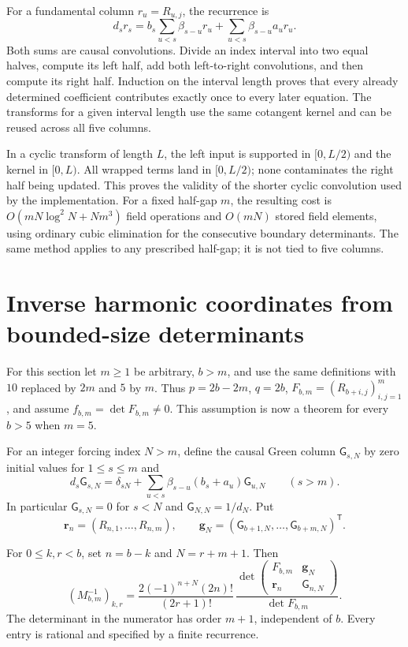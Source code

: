 For a fundamental column $r_u=R_{u,j}$, the recurrence is
\[
 d_sr_s=b_s\sum_{u<s}\beta_{s-u}r_u
                  +\sum_{u<s}\beta_{s-u}a_ur_u.
\]
Both sums are causal convolutions. Divide an index interval into
two equal halves, compute its left half, add both left-to-right
convolutions, and then compute its right half. Induction on the
interval length proves that every already determined coefficient
contributes exactly once to every later equation. The transforms
for a given interval length use the same cotangent kernel and can
be reused across all five columns.

In a cyclic transform of length $L$, the left input is supported
in $[0,L/2)$ and the kernel in $[0,L)$. All wrapped terms land in
$[0,L/2)$; none contaminates the right half being updated.
This proves the validity of the shorter cyclic convolution used
by the implementation. For a fixed half-gap $m$, the resulting
cost is $O(mN\log^2N+Nm^3)$ field operations and $O(mN)$ stored
field elements, using ordinary cubic elimination for the consecutive
boundary determinants. The same method applies to any prescribed
half-gap; it is not tied to five columns.

\section{Inverse harmonic coordinates from bounded-size determinants}
\label{gt:green-section}

For this section let $m\ge1$ be arbitrary, $b>m$, and use the same
definitions with $10$ replaced by $2m$ and $5$ by $m$.
Thus $p=2b-2m$, $q=2b$, $F_{b,m}=(R_{b+i,j})_{i,j=1}^m$, and
assume $f_{b,m}=\det F_{b,m}\ne0$. This assumption is now a theorem
for every $b>5$ when $m=5$.

For an integer forcing index $N>m$, define the causal Green column
$\mathsf G_{s,N}$ by zero initial values for $1\le s\le m$ and
\begin{equation}\label{gt:Green}
 d_s\mathsf G_{s,N}
 =\delta_{sN}+\sum_{u<s}\beta_{s-u}(b_s+a_u)\mathsf G_{u,N}
                                  \qquad(s>m).
\end{equation}
In particular $\mathsf G_{s,N}=0$ for $s<N$ and
$\mathsf G_{N,N}=1/d_N$. Put
\[
 \mathbf r_n=(R_{n,1},\ldots,R_{n,m}),\qquad
 \mathbf g_N=(\mathsf G_{b+1,N},\ldots,
                         \mathsf G_{b+m,N})^{\mathsf T}.
\]

\begin{theorem}
\label{gt:inverse}
For $0\le k,r<b$, set $n=b-k$ and $N=r+m+1$. Then
\begin{equation}\label{gt:inverse-formula}
 \boxed{\displaystyle
 (M_{b,m}^{-1})_{k,r}
 =\frac{2(-1)^{n+N}(2n)!}{(2r+1)!}\,
 \frac{\det\begin{pmatrix}
       F_{b,m}&\mathbf g_N\\
       \mathbf r_n&\mathsf G_{n,N}
                  \end{pmatrix}}{\det F_{b,m}}.}
\end{equation}
The determinant in the numerator has order $m+1$, independent of
$b$. Every entry is rational and specified by a finite recurrence.
\end{theorem}

